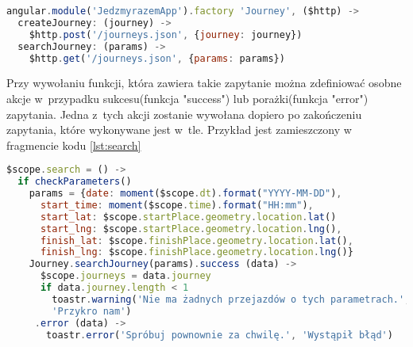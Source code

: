 \documentclass[eng,archivemode]{mgr}
\begin{document}
\begin{lstlisting}[language=JavaScript, caption={Zapytania do API}, label=lst:services]
angular.module('JedzmyrazemApp').factory 'Journey', ($http) ->
  createJourney: (journey) ->
    $http.post('/journeys.json', {journey: journey})
  searchJourney: (params) ->
    $http.get('/journeys.json', {params: params})
\end{lstlisting}

Przy wywołaniu funkcji, która zawiera takie zapytanie można zdefiniować osobne akcje w~przypadku sukcesu(funkcja "success") lub porażki(funkcja "error") zapytania. Jedna z~tych akcji zostanie wywołana dopiero po zakończeniu zapytania, które wykonywane jest w~tle. Przykład jest zamieszczony w fragmencie kodu \ref{lst:search}

\begin{lstlisting}[language=JavaScript, caption={Obsługa zapytania asynchronicznego}, label=lst:search, extendedchars=true]
$scope.search = () ->
  if checkParameters()
    params = {date: moment($scope.dt).format("YYYY-MM-DD"),
      start_time: moment($scope.time).format("HH:mm"),
      start_lat: $scope.startPlace.geometry.location.lat()
      start_lng: $scope.startPlace.geometry.location.lng(),
      finish_lat: $scope.finishPlace.geometry.location.lat(),
      finish_lng: $scope.finishPlace.geometry.location.lng()}
    Journey.searchJourney(params).success (data) ->
      $scope.journeys = data.journey
      if data.journey.length < 1
        toastr.warning('Nie ma żadnych przejazdów o tych parametrach.',
        'Przykro nam')
     .error (data) ->
       toastr.error('Spróbuj pownownie za chwilę.', 'Wystąpił błąd')
\end{lstlisting}
\newpage
\end{document}
